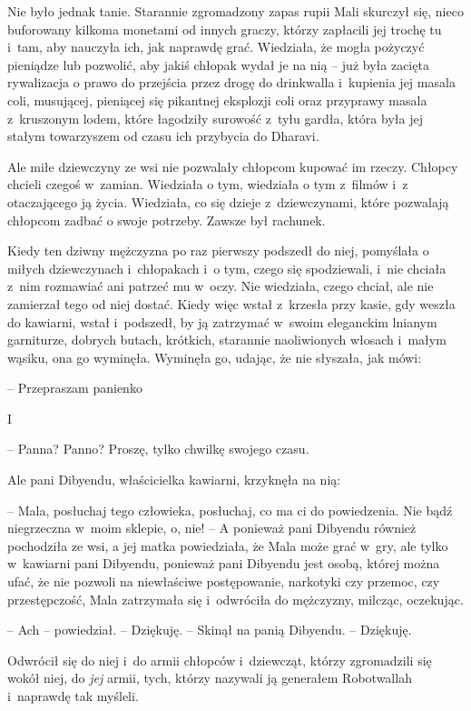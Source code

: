 \documentclass[oneside,polish,11pt,rmheadings]{mwbk}
\begin{document}
Nie było jednak tanie. Starannie zgromadzony zapas rupii Mali skurczył się, nieco buforowany kilkoma monetami od innych graczy, którzy zapłacili jej trochę tu i~tam, aby nauczyła ich, jak naprawdę grać. Wiedziała, że mogła pożyczyć pieniądze lub pozwolić, aby jakiś chłopak wydał je na nią -- już była zacięta rywalizacja o prawo do przejścia przez drogę do drinkwalla i~kupienia jej masala coli, musującej, pieniącej się pikantnej eksplozji coli oraz przyprawy masala z~kruszonym lodem, które łagodziły surowość z~tyłu gardła, która była jej stałym towarzyszem od czasu ich przybycia do Dharavi. 


Ale miłe dziewczyny ze wsi nie pozwalały chłopcom kupować im rzeczy. Chłopcy chcieli czegoś w~zamian. Wiedziała o tym, wiedziała o tym z~filmów i~z otaczającego ją życia. Wiedziała, co się dzieje z~dziewczynami, które pozwalają chłopcom zadbać o swoje potrzeby. Zawsze był rachunek. 


Kiedy ten dziwny mężczyzna po raz pierwszy podszedł do niej, pomyślała o miłych dziewczynach i~chłopakach i~o tym, czego się spodziewali, i~nie chciała z~nim rozmawiać ani patrzeć mu w~oczy. Nie wiedziała, czego chciał, ale nie zamierzał tego od niej dostać. Kiedy więc wstał z~krzesła przy kasie, gdy weszła do kawiarni, wstał i~podszedł, by ją zatrzymać w~swoim eleganckim lnianym garniturze, dobrych butach, krótkich, starannie naoliwionych włosach i~małym wąsiku, ona go wyminęła. Wyminęła go, udając, że nie słyszała, jak mówi: 

-- Przepraszam panienko 

I

-- Panna? Panno? Proszę, tylko chwilkę swojego czasu. 


Ale pani Dibyendu, właścicielka kawiarni, krzyknęła na nią: 

-- Mala, posłuchaj tego człowieka, posłuchaj, co ma ci do powiedzenia. Nie bądź niegrzeczna w~moim sklepie, o, nie! -- A ponieważ pani Dibyendu również pochodziła ze wsi, a jej matka powiedziała, że Mala może grać w~gry, ale tylko w~kawiarni pani Dibyendu, ponieważ pani Dibyendu jest osobą, której można ufać, że nie pozwoli na niewłaściwe postępowanie, narkotyki czy przemoc, czy przestępczość, Mala zatrzymała się i~odwróciła do mężczyzny, milcząc, oczekując. 


-- Ach -- powiedział. -- Dziękuję. -- Skinął na panią Dibyendu. -- Dziękuję. 

 Odwrócił się do niej i~do armii chłopców i~dziewcząt, którzy zgromadzili się wokół niej, do \textit{jej }armii, tych, którzy nazywali ją generałem Robotwallah i~naprawdę tak myśleli. 
\end{document}
